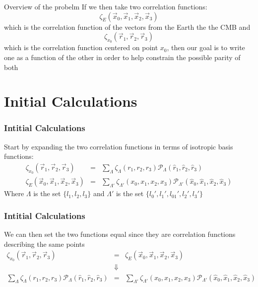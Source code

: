 \documentclass{beamer}
\begin{document}
\begin{frame}{Overview of the probelm}
    If we then take two correlation functions:
    \begin{equation*}
        \zeta_E (\vec x_0, \vec x_1, \vec x_2, \vec x_3)
    \end{equation*}
    which is the correlation function of the vectors from the Earth the the CMB and
    \begin{equation*}
        \zeta_{x_0} (\vec r_1, \vec r_2, \vec r_3)
    \end{equation*}
    which is the correlation function centered on point $x_0$, then our goal is to write one as a function of the other
    in order to help constrain the possible parity of both
\end{frame}

\section{Initial Calculations}
    \begin{frame}
        \frametitle{Intitial Calculations}
        Start by expanding the two correlation functions in terms of isotropic basis functions:
        \begin{eqnarray*}
            \zeta_{x_0} (\vec r_1, \vec r_2, \vec r_3) &=& \sum_{\Lambda} {\zeta_{\Lambda}}(r_1, r_2, r_3) \mathcal P_{\Lambda}(\hat r_1, \hat r_2, \hat r_3)\\
            \zeta_E (\vec x_0, \vec x_1, \vec x_2, \vec x_3) &=& \sum_{\Lambda '} {\zeta_{\Lambda '}}(x_0, x_1, x_2, x_3) \mathcal P_{\Lambda '}(\hat x_0, \hat x_1, \hat x_2, \hat x_3)
        \end{eqnarray*}
        Where $\Lambda$ is the set $\{l_1, l_2, l_3\}$ and $\Lambda'$ is the set $\{l_0', l_1', l_{01}', l_2', l_3'\}$
    \end{frame}

    \begin{frame}
        \frametitle{Intitial Calculations}
        We can then set the two functions equal since they are correlation functions describing the same points
        \begin{eqnarray*}
            \zeta_{x_0} (\vec r_1, \vec r_2, \vec r_3) &=& \zeta_E (\vec x_0, \vec x_1, \vec x_2, \vec x_3)\\
            &\Downarrow&\\
            \sum_{\Lambda} \zeta_{\Lambda}(r_1, r_2, r_3) \mathcal P_{\Lambda}(\hat r_1, \hat r_2, \hat r_3) &=& \sum_{\Lambda '} \zeta_{\Lambda '}(x_0, x_1, x_2, x_3) \mathcal P_{\Lambda '}(\hat x_0, \hat x_1, \hat x_2, \hat x_3)
        \end{eqnarray*}
    \end{frame}
\end{document}
